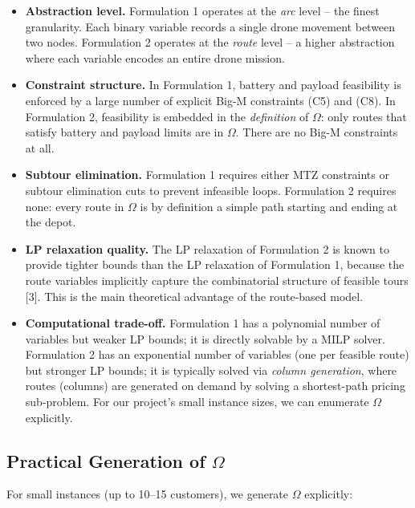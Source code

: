 \documentclass[12pt,a4paper]{article}
\begin{document}
\begin{itemize}
  \item \textbf{Abstraction level.} Formulation 1 operates at the \emph{arc} level --
  the finest granularity. Each binary variable records a single drone movement between
  two nodes. Formulation 2 operates at the \emph{route} level -- a higher abstraction
  where each variable encodes an entire drone mission.

  \item \textbf{Constraint structure.} In Formulation 1, battery and payload feasibility
  is enforced by a large number of explicit Big-M constraints (C5) and (C8). In
  Formulation 2, feasibility is embedded in the \emph{definition} of $\Omega$: only
  routes that satisfy battery and payload limits are in $\Omega$. There are no Big-M
  constraints at all.

  \item \textbf{Subtour elimination.} Formulation 1 requires either MTZ constraints or
  subtour elimination cuts to prevent infeasible loops. Formulation 2 requires none:
  every route in $\Omega$ is by definition a simple path starting and ending at the depot.

  \item \textbf{LP relaxation quality.} The LP relaxation of Formulation 2 is known
  to provide tighter bounds than the LP relaxation of Formulation 1, because the route
  variables implicitly capture the combinatorial structure of feasible tours [3]. This is the main theoretical advantage of the route-based model.

  \item \textbf{Computational trade-off.} Formulation 1 has a polynomial number of
  variables but weaker LP bounds; it is directly solvable by a MILP solver.
  Formulation 2 has an exponential number of variables (one per feasible route) but
  stronger LP bounds; it is typically solved via \emph{column generation}, where routes
  (columns) are generated on demand by solving a shortest-path pricing sub-problem.
  For our project's small instance sizes, we can enumerate $\Omega$ explicitly.
\end{itemize}

\subsection{Practical Generation of $\Omega$}

For small instances (up to 10--15 customers), we generate $\Omega$ explicitly:
\end{document}
